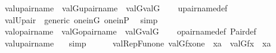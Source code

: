 \begin{isabellebody}
\isanewline
{}\isamarkupfalse%
\ val{\isacharunderscore}{\kern0pt}upair{\isacharunderscore}{\kern0pt}name\ {\isacharcolon}{\kern0pt}\ {\isachardoublequoteopen}val{\isacharparenleft}{\kern0pt}G{\isacharcomma}{\kern0pt}upair{\isacharunderscore}{\kern0pt}name{\isacharparenleft}{\kern0pt}{\isasymtau}{\isacharcomma}{\kern0pt}{\isasymrho}{\isacharparenright}{\kern0pt}{\isacharparenright}{\kern0pt}\ {\isacharequal}{\kern0pt}\ {\isacharbraceleft}{\kern0pt}val{\isacharparenleft}{\kern0pt}G{\isacharcomma}{\kern0pt}{\isasymtau}{\isacharparenright}{\kern0pt}{\isacharcomma}{\kern0pt}val{\isacharparenleft}{\kern0pt}G{\isacharcomma}{\kern0pt}{\isasymrho}{\isacharparenright}{\kern0pt}{\isacharbraceright}{\kern0pt}{\isachardoublequoteclose}\isanewline
%
\isadelimproof
\ \ %
\endisadelimproof
%
\isatagproof
{}\isamarkupfalse%
\ upair{\isacharunderscore}{\kern0pt}name{\isacharunderscore}{\kern0pt}def\ \isamarkupfalse%
\ val{\isacharunderscore}{\kern0pt}Upair\ \ generic\ one{\isacharunderscore}{\kern0pt}in{\isacharunderscore}{\kern0pt}G\ one{\isacharunderscore}{\kern0pt}in{\isacharunderscore}{\kern0pt}P\ \isamarkupfalse%
\ simp%
\endisatagproof
{\isafoldproof}%
%
\isadelimproof
\isanewline
%
\endisadelimproof
\ \ \ \ \isanewline
{}\isamarkupfalse%
\ val{\isacharunderscore}{\kern0pt}opair{\isacharunderscore}{\kern0pt}name\ {\isacharcolon}{\kern0pt}\ {\isachardoublequoteopen}val{\isacharparenleft}{\kern0pt}G{\isacharcomma}{\kern0pt}opair{\isacharunderscore}{\kern0pt}name{\isacharparenleft}{\kern0pt}{\isasymtau}{\isacharcomma}{\kern0pt}{\isasymrho}{\isacharparenright}{\kern0pt}{\isacharparenright}{\kern0pt}\ {\isacharequal}{\kern0pt}\ {\isasymlangle}val{\isacharparenleft}{\kern0pt}G{\isacharcomma}{\kern0pt}{\isasymtau}{\isacharparenright}{\kern0pt}{\isacharcomma}{\kern0pt}val{\isacharparenleft}{\kern0pt}G{\isacharcomma}{\kern0pt}{\isasymrho}{\isacharparenright}{\kern0pt}{\isasymrangle}{\isachardoublequoteclose}\isanewline
%
\isadelimproof
\ \ %
\endisadelimproof
%
\isatagproof
{}\isamarkupfalse%
\ opair{\isacharunderscore}{\kern0pt}name{\isacharunderscore}{\kern0pt}def\ Pair{\isacharunderscore}{\kern0pt}def\ \isamarkupfalse%
\ val{\isacharunderscore}{\kern0pt}upair{\isacharunderscore}{\kern0pt}name\ \ \isamarkupfalse%
\ simp%
\endisatagproof
{\isafoldproof}%
%
\isadelimproof
\isanewline
%
\endisadelimproof
\ \ \ \ \isanewline
{}\isamarkupfalse%
\ val{\isacharunderscore}{\kern0pt}RepFun{\isacharunderscore}{\kern0pt}one{\isacharcolon}{\kern0pt}\ {\isachardoublequoteopen}val{\isacharparenleft}{\kern0pt}G{\isacharcomma}{\kern0pt}{\isacharbraceleft}{\kern0pt}{\isasymlangle}f{\isacharparenleft}{\kern0pt}x{\isacharparenright}{\kern0pt}{\isacharcomma}{\kern0pt}one{\isasymrangle}\ {\isachardot}{\kern0pt}\ x{\isasymin}a{\isacharbraceright}{\kern0pt}{\isacharparenright}{\kern0pt}\ {\isacharequal}{\kern0pt}\ {\isacharbraceleft}{\kern0pt}val{\isacharparenleft}{\kern0pt}G{\isacharcomma}{\kern0pt}f{\isacharparenleft}{\kern0pt}x{\isacharparenright}{\kern0pt}{\isacharparenright}{\kern0pt}\ {\isachardot}{\kern0pt}\ x{\isasymin}a{\isacharbraceright}{\kern0pt}{\isachardoublequoteclose}\isanewline

\end{isabellebody}
